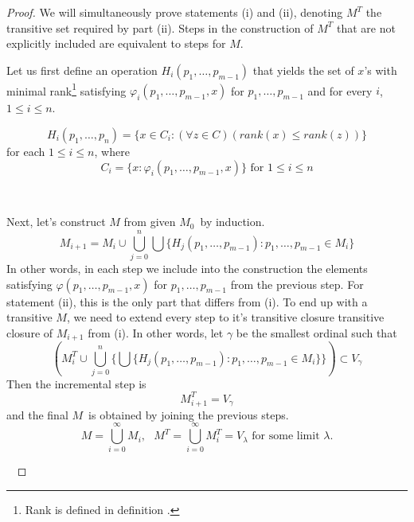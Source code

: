 \begin{proof}
We will simultaneously prove statements (i) and (ii), denoting $M^T$ the transitive set required by part (ii).
Steps in the construction of $M^T$ that are not explicitly included are equivalent to steps for $M$.

Let us first define an operation $H_i(p_1, \ldots, p_{m-1})$ that yields the set of $x$'s with minimal rank\footnote{Rank is defined in definition .} satisfying $\varphi_i(p_1, \ldots, p_{m-1}, x)$ for $p_1, \ldots, p_{m-1}$ and for every $i$, $1 \leq i \leq n$.

\begin{equation}
H_i(p_1, \ldots, p_n) = \{x \in C_i: (\forall z \in C)(rank(x) \leq rank(z))\}
\end{equation}
for each $1 \leq i \leq n$, where
\begin{equation}
C_i = \{x: \varphi_i(p_1, \ldots, p_{m-1}, x)\} \mbox{ for $1 \leq i \leq n$}
\end{equation}

\

Next, let's construct $M$ from given $M_0$ by induction. 
\begin{equation}
M_{i+1} = M_i \cup \bigcup_{j=0}^{n} \bigcup \{H_j(p_1, \ldots, p_{m-1}): p_1, \ldots, p_{m-1} \in M_i\}
\end{equation}
In other words, in each step we include into the construction the elements satisfying $\varphi(p_1, \ldots, p_{m-1}, x)$ for $p_1, \ldots, p_{m-1}$ from the previous step.
For statement (ii), this is the only part that differs from (i). To end up with a transitive $M$, we need to extend every step to it's transitive closure transitive closure of $M_{i+1}$ from (i). In other words, let $\gamma$ be the smallest ordinal such that 
\begin{equation}
(M^T_i \cup \bigcup_{j=0}^{n} \{\bigcup\{H_j(p_1, \ldots, p_{m-1}): p_1, \ldots, p_{m-1} \in M_i\}\}) \subset V_\gamma
\end{equation}
Then the incremental step is
\begin{equation}
M^T_{i+1} = V_\gamma
\end{equation}
and the final $M$ is obtained by joining the previous steps.
\begin{equation}
M = \bigcup_{i=0}^{\infty} M_i, \mbox{  }M^T = \bigcup_{i=0}^{\infty} M^T_i = V_\lambda\mbox{ for some limit }\lambda\mbox{.}
\end{equation}

\


\end{proof}
